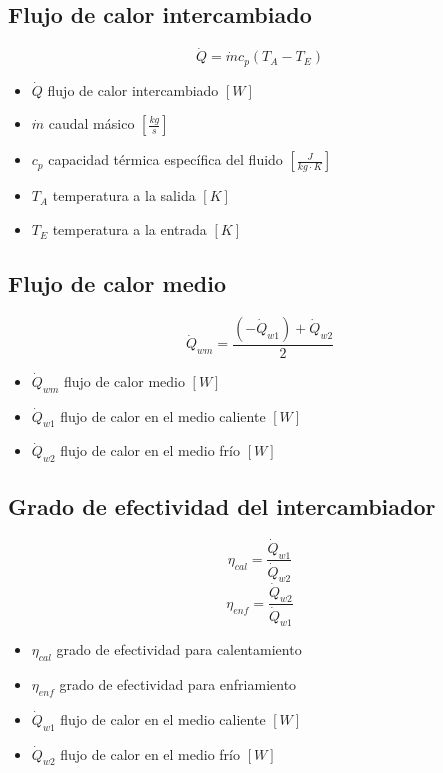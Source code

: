 \documentclass[letterpaper,11pt]{article} %
\begin{document}
\subsection{Flujo de calor intercambiado}
\begin{equation}
\dot{Q} = \dot{m}c_p (T_{A}-T_{E})
\end{equation}
\begin{itemize}
	\item $\dot{Q}$ flujo de calor intercambiado $[W]$
	\item $\dot{m}$ caudal másico $[\frac{kg}{s}]$
	\item $c_p$ capacidad térmica específica del fluido $[\frac{J}{kg\cdot K}]$
	\item $T_{A}$ temperatura a la salida $[K]$
	\item $T_{E}$ temperatura a la entrada $[K]$ 
\end{itemize}
\subsection{Flujo de calor medio}
\begin{equation}
\dot{Q}_{wm} = \frac{(-\dot{Q}_{w1}) + \dot{Q}_{w2}}{2}
\end{equation} 
\begin{itemize}
	\item $\dot{Q}_{wm}$ flujo de calor medio $[W]$
	\item $\dot{Q}_{w1}$ flujo de calor en el medio caliente $[W]$
	\item $\dot{Q}_{w2}$ flujo de calor en el medio frío $[W]$
\end{itemize}
\subsection{Grado de efectividad del intercambiador}
\begin{equation}
\eta_{cal} = \frac{\dot{Q}_{w1}}{\dot{Q}_{w2}}
\end{equation} 
\begin{equation}
\eta_{enf} = \frac{\dot{Q}_{w2}}{\dot{Q}_{w1}}
\end{equation}
\begin{itemize}
	\item $\eta_{cal}$ grado de efectividad para calentamiento
	\item $\eta_{enf}$ grado de efectividad para enfriamiento
	\item $\dot{Q}_{w1}$ flujo de calor en el medio caliente $[W]$
	\item $\dot{Q}_{w2}$ flujo de calor en el medio frío $[W]$
\end{itemize}
\end{document}
